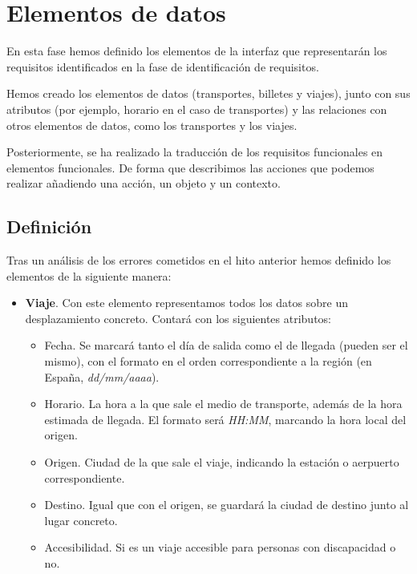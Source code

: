 \section{Elementos de datos}

En esta fase hemos definido los elementos de la interfaz que representarán los
requisitos identificados en la fase de identificación de requisitos.

Hemos creado los elementos de datos (transportes, billetes y viajes), junto con sus
atributos (por ejemplo, horario en el caso de transportes) y las relaciones con otros
elementos de datos, como los transportes y los viajes.

Posteriormente, se ha realizado la traducción de los requisitos funcionales en elementos
funcionales. De forma que describimos las acciones que podemos realizar añadiendo una acción,
un objeto y un contexto.

\subsection{Definición}

Tras un análisis de los errores cometidos en el hito anterior hemos definido los elementos
de la siguiente manera:

\begin{itemize}
    \item \textbf{Viaje}. Con este elemento representamos todos los datos sobre un desplazamiento
    concreto. Contará con los siguientes atributos:
    \begin{itemize}
        \item Fecha. Se marcará tanto el día de salida como el de llegada (pueden ser el mismo),
            con el formato en el orden correspondiente a la región (en España, \textit{dd/mm/aaaa}).
        \item Horario. La hora a la que sale el medio de transporte, además de la hora estimada de 
            llegada. El formato será \textit{HH:MM}, marcando la hora local del origen.
        \item Origen. Ciudad de la que sale el viaje, indicando la estación o aerpuerto correspondiente.
        \item Destino. Igual que con el origen, se guardará la ciudad de destino junto al lugar concreto.
        \item Accesibilidad. Si es un viaje accesible para personas con discapacidad o no.

    \end{itemize}

\end{itemize}
